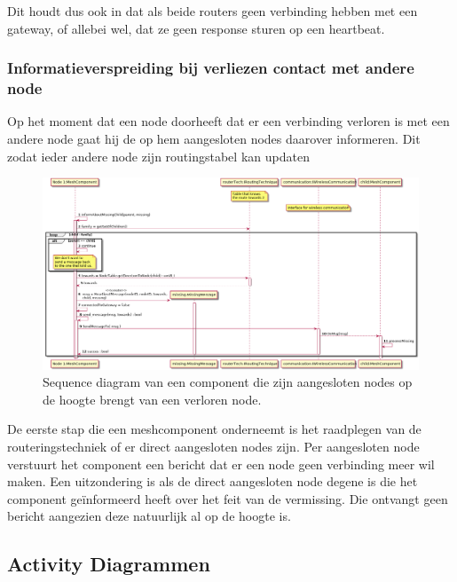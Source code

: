 \documentclass[a4paper, 11pt, oneside]{report}
\begin{document}
Dit houdt dus ook in dat als beide routers geen verbinding hebben met een gateway, of allebei wel, dat ze geen response sturen op een heartbeat.

\subsubsection{Informatieverspreiding bij verliezen contact met andere node}
\label{DetailedDesign:Communicatie:sequence:contactverlies}
Op het moment dat een node doorheeft dat er een verbinding verloren is met een andere node gaat hij de op hem aangesloten nodes daarover informeren. Dit zodat ieder andere node zijn routingstabel kan updaten 
\begin{figure}[H]
	\begin{center}\includegraphics[width=\linewidth]{UML/out/Communication/Sequence/LostConnectionWithOther/LostConnectionWithOther.png}\end{center}
	\caption{Sequence diagram van een component die zijn aangesloten nodes op de hoogte brengt van een verloren node.}
	\label{fig:communication:sequence:contactverlies}
\end{figure}

De eerste stap die een meshcomponent onderneemt is het raadplegen van de routeringstechniek of er direct aangesloten nodes zijn.
Per aangesloten node verstuurt het component een bericht dat er een node geen verbinding meer wil maken.
Een uitzondering is als de direct aangesloten node degene is die het component geïnformeerd heeft over het feit van de vermissing.
Die ontvangt geen bericht aangezien deze natuurlijk al op de hoogte is.


\subsection{Activity Diagrammen}
\label{DetailedDesign:Communicatie:Activity}
\end{document}
